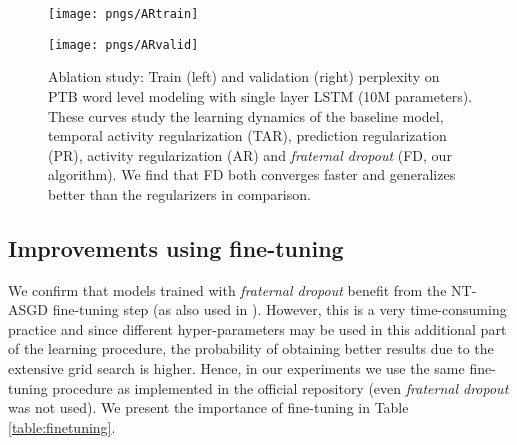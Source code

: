 \documentclass{article} %
\begin{document}
\begin{figure}[t]
\vspace{-0.08cm}
  \centering
  \begin{minipage}[b]{0.48\textwidth}
    \texttt{[image: pngs/ARtrain]}
  \end{minipage}
  \hfill
  \begin{minipage}[b]{0.48\textwidth}
    \texttt{[image: pngs/ARvalid]}
  \end{minipage}
  \caption{Ablation study: Train (left) and validation (right) perplexity on PTB word level modeling with single layer LSTM (10M parameters). These curves study the learning dynamics of the baseline model, temporal activity regularization (TAR), prediction regularization (PR), activity regularization (AR) and \emph{fraternal dropout} (FD, our algorithm). We find that FD both converges faster and generalizes better than the regularizers in comparison.}
\label{fig_ar_tar}
\vspace{-0.08cm}
\end{figure}

\subsection{Improvements using fine-tuning}
\label{finetuning}

We confirm that models trained with \emph{fraternal dropout} benefit from the NT-ASGD fine-tuning step (as also used in \citet{merity2017regularizing}). However, this is a very time-consuming practice and since different hyper-parameters may be used in this additional part of the learning procedure, the probability of obtaining better results due to the extensive grid search is higher. Hence, in our experiments we use the same fine-tuning procedure as implemented in the official repository (even \emph{fraternal dropout} was not used). We present the importance of fine-tuning in Table \ref{table:finetuning}.
\end{document}
